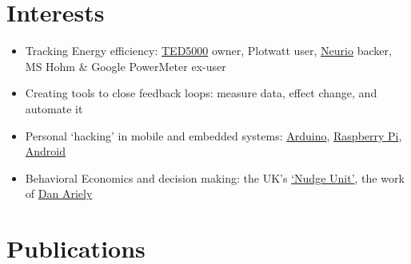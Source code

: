 \documentclass[letterpaper,10pt,english]{sphinxmanual}
\begin{document}
\chapter{Interests}
\label{resume:interests}\begin{itemize}
\item {} 
Tracking Energy efficiency:
\href{http://www.theenergydetective.com/}{TED5000} owner,
Plotwatt user, \href{https://neur.io/}{Neurio}
backer, MS Hohm \& Google
PowerMeter ex-user

\item {} 
Creating tools to close feedback loops: measure data, effect change,
and automate it

\item {} 
Personal `hacking' in mobile and embedded systems:
\href{http://www.arduino.cc/}{Arduino}, \href{http://www.raspberrypi.org/}{Raspberry
Pi},
\href{http://www.android.com/}{Android}

\item {} 
Behavioral Economics and decision making: the UK's \href{https://www.gov.uk/government/organisations/behavioural-insights-team}{`Nudge
Unit'},
the work of \href{http://danariely.com/}{Dan Ariely}

\end{itemize}


\chapter{Publications}
\label{resume:publications}
\end{document}

